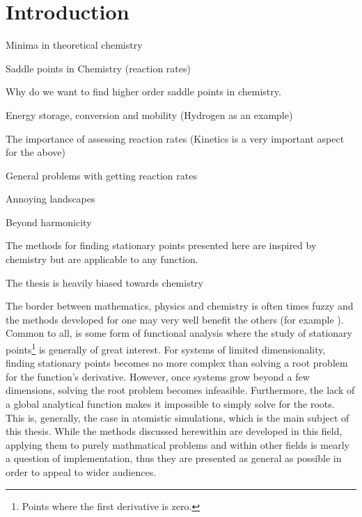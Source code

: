 \chapter{Introduction}
\label{chap:introduction}

\bit
\item Minima in theoretical chemistry
\item Saddle points in Chemistry (reaction rates)
\item Why do we want to find higher order saddle points in chemistry.
\item Energy storage, conversion and mobility (Hydrogen as an example)
\item The importance of assessing reaction rates (Kinetics is a very important aspect for the above)
\item General problems with getting reaction rates
\item Annoying landscapes
\item Beyond harmonicity
\item The methods for finding stationary points presented here are inspired by chemistry but are applicable to any function.
\item The thesis is heavily biased towards chemistry
\eit

The border between mathematics, physics and chemistry is often times fuzzy and the methods developed for one may very well benefit the others (for example \expand \citemiss).
Common to all, is some form of functional analysis where the study of stationary points\footnote{Points where the first derivative is zero.} is generally of great interest.
For systems of limited dimensionality, finding stationary points becomes no more complex than solving a root problem for the function's derivative.
However, once systems grow beyond a few dimensions, solving the root problem becomes infeasible.
Furthermore, the lack of a global analytical function  makes it impossible to simply solve for the roots.
This is, generally, the case in atomistic simulations, which is the main subject of this thesis.
While the methods discussed herewithin are developed in this field, applying them to purely mathmatical problems and within other fields is mearly a question of implementation, thus they are presented as general as possible in order to appeal to wider audiences.

